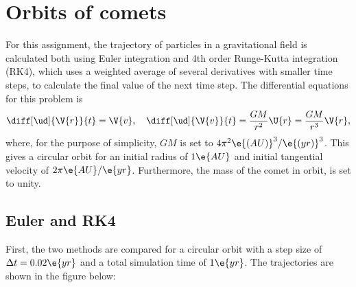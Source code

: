 \documentclass[a4paper,10pt]{article} 	%
\numberwithin{equation}{section}
\begin{document}
 	\section{Orbits of comets}
 	For this assignment, the trajectory of particles in a gravitational field is calculated both using Euler integration and 4th order Runge-Kutta integration (RK4), which uses a weighted average of several derivatives with smaller time steps, to calculate the final value of the next time step. The differential equations for this problem is
 	\begin{equation}
 		\diff[\ud]{\V{r}}{t} = \V{v}, \quad \diff[\ud]{\V{v}}{t} = \frac{GM}{r^2}\U{r} = \frac{GM}{r^3}\V{r},
 	\end{equation}
 	where, for the purpose of simplicity, $ GM $ is set to $ 4\pi^2 \e{(AU)}^3/\e{(yr)}^3 $. This gives a circular orbit for an initial radius of $ 1 \e{AU} $ and initial tangential velocity of $ 2 \pi \e{AU}/\e{yr} $. Furthermore, the mass of the comet in orbit, is set to unity. 
 	
 	\subsection{Euler and RK4}
 	First, the two methods are compared for a circular orbit with a step size of $ \Delta t = 0.02 \e{yr} $ and a total simulation time of $ 1 \e{yr} $. The trajectories are shown in the figure below:
 	
\end{document}
